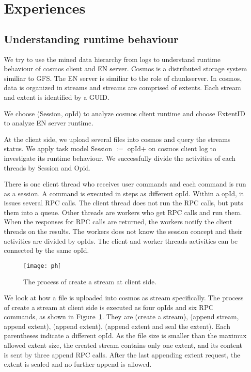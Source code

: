 
\section{Experiences}
\label{sec:exp}


\subsection{Understanding runtime behaviour}

We try to use the mined data hierarchy from logs to
understand runtime behaviour of cosmos client and EN server.
Cosmos is a distributed storage system similiar to GFS. The
EN server is similiar to the role of chunkserver. In cosmos,
data is organized in streams and streams are comprised of
extents. Each stream and extent is identified by a GUID.

We choose (Session, opId) to analyze cosmos client runtime
and choose ExtentID to analyze EN server runtime.

At the client side, we upload several files into cosmos and
query the streams status. We apply task model Session $:=$
opId$+$ on cosmos client log to investigate its runtime
behaviour. We successfully divide the activities of each
threads by Session and Opid.

There is one client thread who receives user commands and
each command is run as a session. A command is executed in
steps as different opId. Within a opId, it issues several
RPC calls. The client thread does not run the RPC calls, but
puts them into a queue. Other threads are workers who get
RPC calls and run them. When the responses for RPC calls are
returned, the workers notify the client threads on the
results. The workers does not know the session concept and
their activities are divided by opIds. The client and worker
threads activities can be connected by the same opId.

\begin{figure}
\centering
\texttt{[image: ph]}
\caption{The process of create a stream at client side.}
\label{fig:createstream}
\end{figure}

We look at how a file is uploaded into cosmos as stream
specifically. The process of create a stream at client side
is executed as four opIds and six RPC commands, as shown in
Figure~\ref{fig:createstream}. They are (create a stream),
(append stream, append extent), (append extent), (append
extent and seal the extent). Each parentheses indicate a
different opId. As the file size is smaller than the maximux
allowed extent size, the created stream contains only one
extent, and its content is sent by three append RPC calls.
After the last appending extent request, the extent is
sealed and no further append is allowed.

